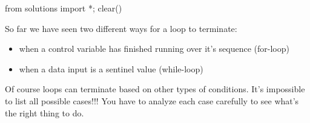 \begin{python0}
from solutions import *; clear()
\end{python0}

So far we have seen two different ways for a loop to terminate:

\begin{itemize}
\item
  when a control variable has finished running over it's
  sequence (for-loop)
\item
  when a data input is a sentinel value (while-loop)
\end{itemize}

Of course loops can terminate based on other types of conditions.
It's impossible to list all possible cases!!! You have
to analyze each case carefully to see what's the right
thing to do.

